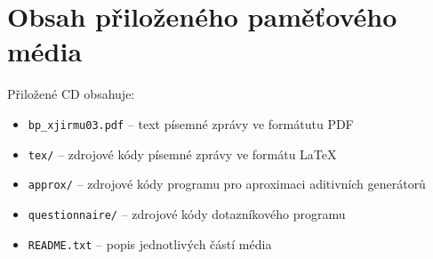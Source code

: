 \chapter{Obsah přiloženého pamě\v tového média}

Přiložené CD obsahuje:
\begin{itemize}
  \item \texttt{bp\_xjirmu03.pdf} -- text písemné zprávy ve formátutu PDF
  \item \texttt{tex/} -- zdrojové k\' ody písemné zprávy ve formátu \LaTeX
  \item \texttt{approx/} -- zdrojové k\' ody programu pro aproximaci aditivních generátor\r u
  \item \texttt{questionnaire/} -- zdrojové k\' ody dotazníkového programu
  \item \texttt{README.txt} -- popis jednotlivých částí média
\end{itemize}